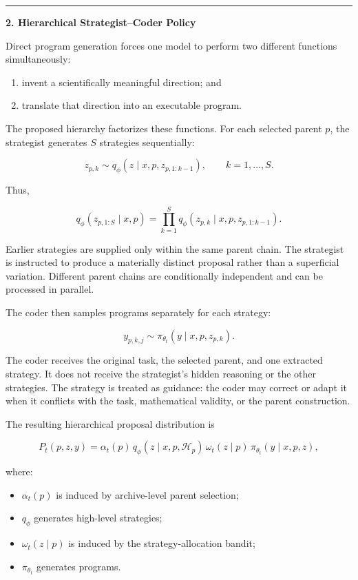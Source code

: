 \documentclass[
]{article}
\providecommand{\tightlist}{%
  \setlength{\itemsep}{0pt}\setlength{\parskip}{0pt}}
\begin{document}
\begin{center}\rule{0.5\linewidth}{0.5pt}\end{center}

\textbf{2. Hierarchical Strategist--Coder Policy}

Direct program generation forces one model to perform two different
functions simultaneously:

\begin{enumerate}
\def\labelenumi{\arabic{enumi}.}
\tightlist
\item
  invent a scientifically meaningful direction; and
\item
  translate that direction into an executable program.
\end{enumerate}

The proposed hierarchy factorizes these functions. For each selected
parent \(p\), the strategist generates \(S\) strategies sequentially:

\[
z_{p,k}
\sim
q_\phi\!\left(
z\mid x,p,z_{p,1:k-1}
\right),
\qquad
k=1,\ldots,S.
\]

Thus,

\[
q_\phi(z_{p,1:S}\mid x,p)
=
\prod_{k=1}^{S}
q_\phi\!\left(
z_{p,k}\mid x,p,z_{p,1:k-1}
\right).
\]

Earlier strategies are supplied only within the same parent chain. The
strategist is instructed to produce a materially distinct proposal
rather than a superficial variation. Different parent chains are
conditionally independent and can be processed in parallel.

The coder then samples programs separately for each strategy:

\[
y_{p,k,j}
\sim
\pi_{\theta_t}
\left(
y\mid x,p,z_{p,k}
\right).
\]

The coder receives the original task, the selected parent, and one
extracted strategy. It does not receive the strategist's hidden
reasoning or the other strategies. The strategy is treated as guidance:
the coder may correct or adapt it when it conflicts with the task,
mathematical validity, or the parent construction.

The resulting hierarchical proposal distribution is

\[
P_t(p,z,y)
=
\alpha_t(p)\,
q_\phi(z\mid x,p,\mathcal{H}_p)\,
\omega_t(z\mid p)\,
\pi_{\theta_t}(y\mid x,p,z),
\]

where:

\begin{itemize}
\tightlist
\item
  \(\alpha_t(p)\) is induced by archive-level parent selection;
\item
  \(q_\phi\) generates high-level strategies;
\item
  \(\omega_t(z\mid p)\) is induced by the strategy-allocation bandit;
\item
  \(\pi_{\theta_t}\) generates programs.
\end{itemize}
\end{document}
